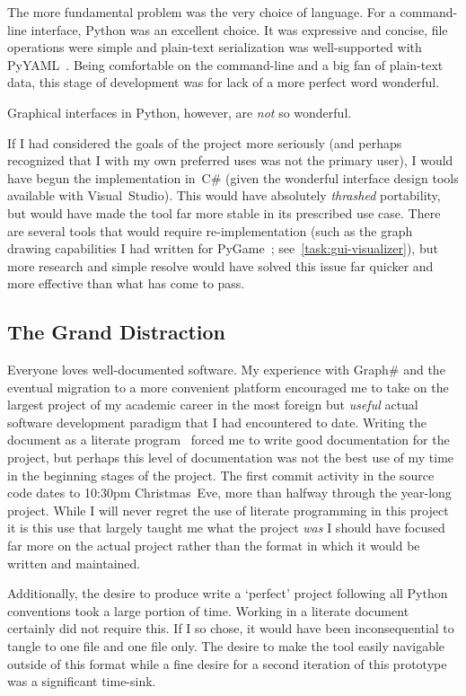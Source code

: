 The more fundamental problem was the very choice of language.
For a command-line interface, Python was an excellent choice.
It was expressive and concise, file operations were simple and
  plain-text serialization was well-supported with PyYAML~\autocite{pyyaml}.
Being comfortable on the command-line and a big fan of plain-text data,
  this stage of development was \Dash for lack of a more perfect word \Dash wonderful.

Graphical interfaces in Python, however, are \emph{not} so wonderful.

If I had considered the goals of the project more seriously
  (and perhaps recognized that I \Dash with my own preferred uses \Dash was not the primary user),
  I would have begun the implementation in~C\#
  (given the wonderful interface design tools available with Visual~Studio).
This would have absolutely \emph{thrashed} portability,
  but would have made the tool far more stable in its prescribed use case.
There are several tools that would require re-implementation
  (such as the graph drawing capabilities I had written
  for PyGame~\autocite{pygame}; see~\autoref{task:gui-visualizer}),
  but more research and simple resolve would have solved this issue
  far quicker and more effective than what has come to pass.

\subsection{The Grand Distraction}
Everyone loves well-documented software.
My experience with Graph\# \Dash and the eventual migration to a more convenient platform \Dash
  encouraged me to take on the largest project of my academic career in
  the most foreign \Dash but \emph{useful} \Dash actual software development paradigm
  that I had encountered to date.
Writing the document as a literate program~\autocite{knuth:lit-prog}
  forced me to write good documentation for the project,
  but perhaps this level of documentation was not the best use of my time
  in the beginning stages of the project.
The first commit activity in the source code dates to 10:30pm Christmas~Eve,
  more than halfway through the year-long project.
While I will never regret the use of literate programming in this project \Dash
  it is this use that largely taught me what the project \emph{was} \Dash
  I should have focused far more on the actual project
  rather than the format in which it would be written and maintained.

Additionally, the desire to produce write a \enquote*{perfect} project \Dash
  following all Python conventions \Dash
  took a large portion of time.
Working in a literate document certainly did not require this.
If I so chose, it would have been inconsequential to tangle to
  one file and one file only.
The desire to make the tool easily navigable outside of this format \Dash
  while a fine desire for a second iteration of this prototype \Dash
  was a significant time-sink.

